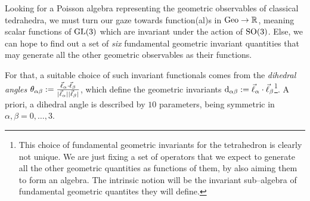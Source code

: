 Looking for a Poisson algebra representing the geometric observables of classical tedrahedra, we must turn our gaze towards function(al)s in $\text{\normalfont Geo}\to\mathbb{R}$, meaning scalar functions of $\text{\normalfont GL}(3)$ which are invariant under the action of $\text{\normalfont SO}(3)$. Else, we can hope to find out a set of \emph{six} fundamental geometric invariant quantities that may generate all the other geometric observables as their functions. 

For that, a suitable choice of such invariant functionals comes from the \emph{dihedral angles} $\theta_{\alpha\beta}:=\frac{\vec{\ell}_\alpha\cdot\vec{\ell}_\beta}{|\vec{\ell}_\alpha||\vec{\ell}_\beta|}$, which define the geometric invariants $\text{\normalfont d}_{\alpha\beta}:=\vec{\ell}_\alpha\cdot\vec{\ell}_\beta$\footnote{This choice of fundamental geometric invariants for the tetrahedron is clearly not unique. We are just fixing a set of operators that we expect to generate all the other geometric quantities as functions of them, by also aiming them to form an algebra. The intrinsic notion will be the invariant sub--algebra of fundamental geometric quantites they will define.}. A priori, a dihedral angle is described by $10$ parameters, being symmetric in $\alpha,\beta=0,\hdots,3$. 

